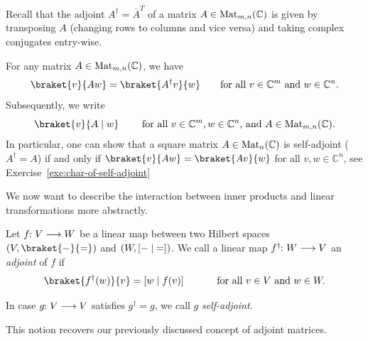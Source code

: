 \documentclass[a4paper, oneside, 12pt]{amsart}
\begin{document}
Recall that the adjoint \(A^{\dagger} = \overline{A}^{T}\) of a matrix  \(A \in \operatorname{Mat}_{m,n}( \mathbb{C})\) is given by transposing \(A\) (\ie changing rows to columns and vice versa) and taking complex conjugates entry-wise.

\begin{remark}\label{rmk:adjoint-and-standard-product}
  For any matrix \(A\in \operatorname{Mat}_{m,n}( \mathbb{C})\), we have
  \begin{equation}
    \braket{ v }{Aw} = \braket{A^{\dagger}v}{w} \qquad \text{for all \(v \in \mathbb{C}^{m}\) and \(w \in \mathbb{C}^{n}\)}.
  \end{equation}
  Subsequently, we  write
  \begin{equation}
    \braket{v}{A \mid w} \qquad \text{ for all } v\in \mathbb{C}^{m}, w \in \mathbb{C}^{n} \text{, and }A \in \Mat_{m,n}( \mathbb{C}).
  \end{equation}
  In particular, one can show that a square matrix \(A\in \operatorname{Mat}_{n}( \mathbb{C})\) is self-adjoint (\ie \(A^{\dagger} = A\)) if and only if
  \(\braket{ v }{Aw} = \braket{Av}{w}\) for all \(v, w \in \mathbb{C}^{n}\), see Exercise~\ref{exe:char-of-self-adjoint}
\end{remark}

We now want to describe the interaction between inner products and linear transformations more abstractly.

\begin{definition}\label{def:adjoint-of-linear-map}
  Let \(f\from V \to W\) be a linear map between two Hilbert spaces \((V, \braket{ \blank }{ \bblank})\) and \((W, [ {-} \mid {=}])\).
  We call a linear map \(f^{\dagger} \from W \to V\) an \emph{adjoint} of \(f\) if
  \begin{equation}
    \braket{f^{\dagger}(w)}{v} = [w\mid f(v)]\qquad\quad \text{ for all } v\in V \text{ and } w\in W.
  \end{equation}

  In case \(g\from V\to V\) satisfies \(g^{\dagger} = g\), we call \(g\) \emph{self-adjoint}.
\end{definition}

This notion recovers our previously discussed concept of adjoint matrices.
\end{document}
